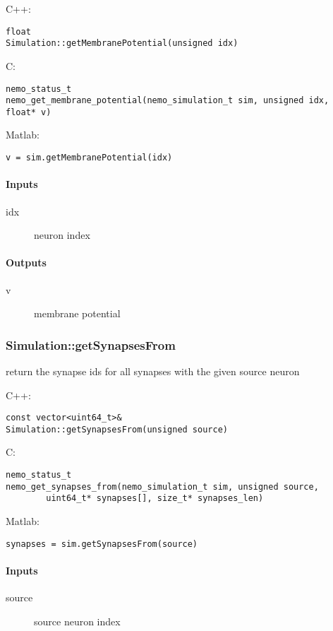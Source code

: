 \noindent C++:
\begin{lstlisting}[aboveskip=2pt]
float
Simulation::getMembranePotential(unsigned idx)
\end{lstlisting}

\noindent C:
\begin{lstlisting}[aboveskip=2pt]
nemo_status_t
nemo_get_membrane_potential(nemo_simulation_t sim, unsigned idx, float* v)
\end{lstlisting}

\noindent Matlab:
\begin{lstlisting}[aboveskip=2pt]
v = sim.getMembranePotential(idx)
\end{lstlisting}
\paragraph{Inputs}
\begin{description}
\item[idx] neuron index
\end{description}
\paragraph{Outputs}
\begin{description}
\item[v] membrane potential
\end{description}

\clearpage
\subsubsection*{Simulation::getSynapsesFrom}
\label{fn: getSynapsesFrom}
return the synapse ids for all synapses with the given source neuron


\noindent C++:
\begin{lstlisting}[aboveskip=2pt]
const vector<uint64_t>&
Simulation::getSynapsesFrom(unsigned source)
\end{lstlisting}

\noindent C:
\begin{lstlisting}[aboveskip=2pt]
nemo_status_t
nemo_get_synapses_from(nemo_simulation_t sim, unsigned source, 
        uint64_t* synapses[], size_t* synapses_len)
\end{lstlisting}

\noindent Matlab:
\begin{lstlisting}[aboveskip=2pt]
synapses = sim.getSynapsesFrom(source)
\end{lstlisting}
\paragraph{Inputs}
\begin{description}
\item[source] source neuron index
\end{description}
